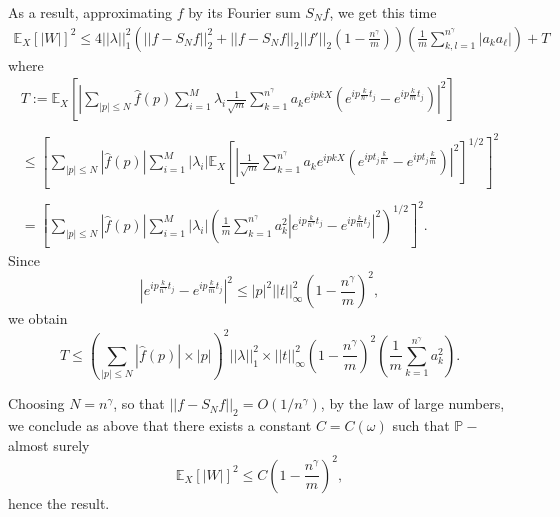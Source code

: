 \documentclass{svproc}
\newcommand \Esp {\mathbb{E}}
\begin{document}
As a result, approximating $f$ by its Fourier sum $S_N f$, we get this time 
\[
\begin{array}{ll}
\Esp_X [|W|]^2 \displaystyle{\leq  4 ||\lambda||_1^2 \left( ||f-S_N f||_2^2 +   ||f-S_N f||_2 ||f'||_2   \left( 1-\frac{n^{\gamma}}{m}\right)\right)\left( \frac{1}{m} \sum_{k,l=1}^{n^{\gamma}} |a_k a_{\ell}|\right)+ T}
\end{array}
\]
where 
\[
\begin{array}{ll}
T:= \displaystyle{  \mathbb E_X \left[\left|\sum_{|p| \leq N} \widehat{f}(p) \sum_{i=1}^M \lambda_i \frac{1}{\sqrt{m}}  \sum_{k=1}^{n^{\gamma}} a_k e^{i p kX} \left( e^{i p \frac{k }{n^{\gamma}}t_j } - e^{i  p \frac{k}{m}t_j}\right) \right|^2 \right] }
\\
\\
  \leq  \displaystyle{  \left[ \sum_{|p| \leq N} |\widehat{f}(p)| \sum_{i=1}^M |\lambda_i|  \mathbb E_X \left[ \left| \frac{1}{\sqrt{m}}  \sum_{k=1}^{n^{\gamma}} a_k e^{i p kX} \left( e^{i p t_j \frac{k }{n^{\gamma}}} - e^{i  p t_j\frac{k}{m}}\right)\right|^2\right]^{1/2} \right]^2 }
  \\
\\
= \displaystyle{  \left[ \sum_{|p| \leq N} |\widehat{f}(p)| \sum_{i=1}^M |\lambda_i|  \left( \frac{1}{m}  \sum_{k=1}^{n^{\gamma}} a_k^2  \left| e^{ip \frac{k }{n^{\gamma}}t_j} - e^{ip \frac{k }{m}t_j} \right|^2\right)^{1/2} \right]^2 }.
\end{array}
\]
Since
\[
\left| e^{ip \frac{k }{n^{\gamma}}t_j} - e^{ip \frac{k }{m}t_j} \right|^2 \leq   |p|^{2}||t||_{\infty}^{2} \left( 1-\frac{n^{\gamma}}{m}\right)^{2},
\]
we obtain
\[
T \leq  \left( \sum_{|p| \leq N} |\widehat{f}(p)| \times |p| \right)^2 ||\lambda||_1^2 \times  ||t||_{\infty}^{2} \left( 1-\frac{n^{\gamma}}{m}\right)^{2}  \left( \frac{1}{m}  \sum_{k=1}^{n^{\gamma}} a_k^2 \right).
\]

Choosing $N=n^{\gamma}$, so that $||f-S_N  f||_2 =O(1/n^{\gamma})$, by the law of large numbers, we conclude as above that  there exists a constant $C=C(\omega)$ such that $\mathbb P-$almost surely 
\[
\Esp_X [|W|]^2 \leq C \left( 1-\frac{n^{\gamma}}{m}\right)^{2}, 
\]
hence the result.
\end{document}
